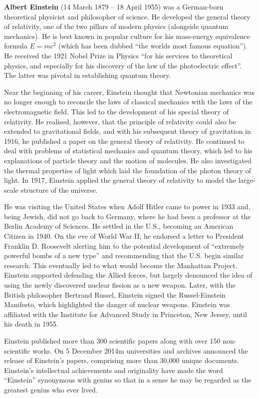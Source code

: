 \documentclass{article}
\begin{document}
\textbf{Albert Einstein} (14 March 1879 -- 18 April 1955) was
a German-born theoretical physicist and philosopher of science. He
developed the general theory of relativity, one of the two pillars
of modern physics (alongside quantum mechanics). He is best known
in popular culture for his mass-energy equivalence formula $E = mc^2$
(which has been dubbed ``the worlds most famous equation''). He received
the 1921 Nobel Prize in Physics ``for his services to theoretical physics,
and especially for his discovery of the law of the photoelectric effect''.
The latter was pivotal in establishing quantum theory.

Near the beginning of his career, Einstein thought that Newtonian
mechanics was no longer enough to reconcile the laws of classical
mechanics with the laws of the electromagnetic field. This led to the
development of his special theory of relativity. He realised, however, that
the principle of relativity could also be extended to gravitational fields,
and with his subsequent theory of gravitation in 1916, he published a paper
on the general theory of relativity. He continued to deal with problems of
statistical mechanics and quantum theory, which led to his explanations of
particle theory and the motion of molecules. He also investigated the
thermal properties of light which laid the foundation of the photon theory
of light. In 1917, Einstein applied the general theory of relativity to
model the large-scale structure of the universe.

He was visiting the United States when Adolf Hitler came to power in 1933
and, being Jewish, did not go back to Germany, where he had been a
professor at the Berlin Academy of Sciences. He settled in the U.S.,
becoming an American Citizen in 1940. On the eve of World War II, he
endorsed a letter to President Franklin D. Roosevelt alerting him to the
potential development of ``extremely powerful bombs of a new type'' and
recommending that the U.S. begin similar research. This eventually led
to what would become the Manhattan Project. Einstein supported defending
the Allied forces, but largely denounced the idea of using the newly 
discovered nuclear fission as a new weapon. Later, with the British
philosopher Bertrand Russel, Einstein signed the Russel-Einstein 
Manifesto, which highlighted the danger of nuclear weapons. Einstein
was affiliated with the Institute for Advanced Study in Princeton,
New Jersey, until his death in 1955.

Einstein published more than 300 scientific papers along with over
150 non-scientific works. On 5 December 2014m universities and
archives announced the release of Einstein's papers, comprising more
than 30,000 unique documents. Einstein's intellectual achievements and
originality have made the word ``Einstein'' synonymous with genius so
that in a sense he may be regarded as the greatest genius who ever lived.
\end{document}

